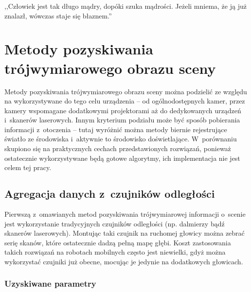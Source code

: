 

\begin{savequote}[70mm]
,,Człowiek jest tak długo mądry, dopóki szuka mądrości. Jeżeli mniema, że ją już
znalazł, wówczas staje się błaznem.''
\end{savequote}

\chapter{Metody pozyskiwania trójwymiarowego obrazu sceny}
\label{chap:porownanie}


Metody pozyskiwania trójwymiarowego obrazu sceny można podzielić ze względu
na wykorzystywane do tego celu urządzenia -- od ogólnodostępnych kamer, przez
kamery wspomagane dodatkowymi projektorami aż do dedykowanych urządzeń 
i~skanerów laserowych. Innym kryterium podziału może być sposób pobierania
informacji z~otoczenia -- tutaj wyróżnić można metody biernie rejestrujące
światło ze środowiska i~aktywnie to środowisko doświetlające. W~porównaniu
skupiono się na praktycznych cechach przedstawionych rozwiązań, ponieważ
ostatecznie wykorzystywane będą gotowe algorytmy, ich implementacja nie jest
celem tej pracy.

\section{Agregacja danych z~czujników odległości}

Pierwszą z~omawianych metod pozyskiwania trójwymiarowej informacji o~scenie jest
wykorzystanie tradycyjnych czujników odległości (np. dalmierzy bądź skanerów
laserowych). Montując taki czujnik na ruchomej głowicy można zebrać serię
skanów, które ostatecznie dadzą pełną mapę głębi. Koszt zastosowania takich
rozwiązań na robotach mobilnych często jest niewielki, gdyż można wykorzystać
czujniki już obecne, mocując je jedynie na dodatkowych głowicach.

\subsection{Uzyskiwane parametry}

